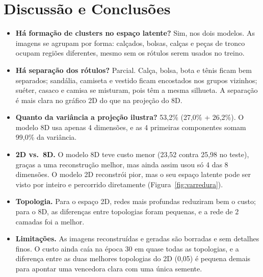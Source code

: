 \documentclass[11pt,a4paper]{article}
\begin{document}
\section{Discussão e Conclusões}

\begin{itemize}
    \item \textbf{Há formação de clusters no espaço latente?} Sim, nos dois modelos. As imagens se agrupam por forma: calçados, bolsas, calças e peças de tronco ocupam regiões diferentes, mesmo sem os rótulos serem usados no treino.
    \item \textbf{Há separação dos rótulos?} Parcial. Calça, bolsa, bota e tênis ficam bem separados; sandália, camiseta e vestido ficam encostados nos grupos vizinhos; suéter, casaco e camisa se misturam, pois têm a mesma silhueta. A separação é mais clara no gráfico 2D do que na projeção do 8D.
    \item \textbf{Quanto da variância a projeção ilustra?} 53,2\% (27,0\% + 26,2\%). O modelo 8D usa apenas 4 dimensões, e as 4 primeiras componentes somam 99,0\% da variância.
    \item \textbf{2D vs.\ 8D.} O modelo 8D teve custo menor (23,52 contra 25,98 no teste), graças a uma reconstrução melhor, mas ainda assim usou só 4 das 8 dimensões. O modelo 2D reconstrói pior, mas o seu espaço latente pode ser visto por inteiro e percorrido diretamente (Figura~\ref{fig:varredura}).
    \item \textbf{Topologia.} Para o espaço 2D, redes mais profundas reduziram bem o custo; para o 8D, as diferenças entre topologias foram pequenas, e a rede de 2 camadas foi a melhor.
    \item \textbf{Limitações.} As imagens reconstruídas e geradas são borradas e sem detalhes finos. O custo ainda caía na época 30 em quase todas as topologias, e a diferença entre as duas melhores topologias do 2D (0,05) é pequena demais para apontar uma vencedora clara com uma única semente.
\end{itemize}
\end{document}
